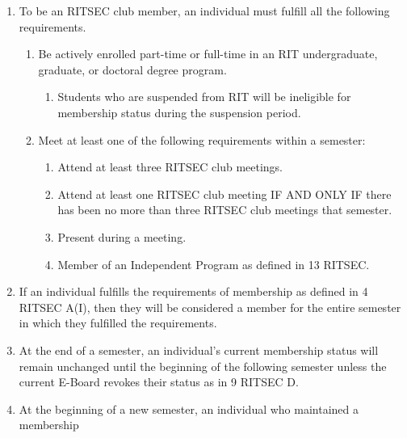 


\begin{enumerate}
	\item To be an RITSEC club member, an individual must fulfill all the following
	      requirements.
	      \begin{enumerate}
		      \item Be actively enrolled part-time or full-time in an RIT undergraduate, graduate,
		            or doctoral degree program.
		            \begin{enumerate}
			            \item Students who are suspended from RIT will be ineligible for membership status
			                  during the suspension period.
		            \end{enumerate}
		      \item Meet at least one of the following requirements within a semester:
		            \begin{enumerate}
			            \item Attend at least three RITSEC club meetings.
			            \item Attend at least one RITSEC club meeting IF AND ONLY IF there has been no more
			                  than three RITSEC club meetings that semester.
			            \item Present during a meeting.
			            \item Member of an Independent Program as defined in 13 RITSEC.
		            \end{enumerate}
	      \end{enumerate}
	\item If an individual fulfills the requirements of membership as defined in 4 RITSEC
	      A(I), then they will be considered a member for the entire semester in which
	      they fulfilled the requirements.
	\item At the end of a semester, an individual's current membership status will remain
	      unchanged until the beginning of the following semester unless the current
	      E-Board revokes their status as in 9 RITSEC D.
	\item At the beginning of a new semester, an individual who maintained a membership

\end{enumerate}
